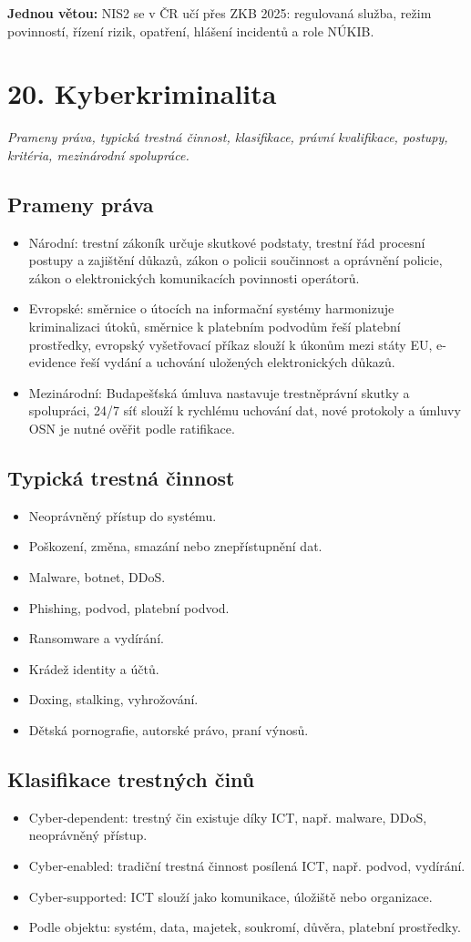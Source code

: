 \documentclass[10pt,a4paper]{article}
\newcommand{\otazka}[2]{\section*{#1}\addcontentsline{toc}{section}{#1}\textit{#2}\par\medskip}
\newcommand{\blok}[1]{\subsection*{#1}}
\newcommand{\mini}[1]{\medskip\noindent\colorbox{blue!7}{\parbox{\dimexpr\linewidth-2\fboxsep}{\textbf{Jednou větou:} #1}}\par\medskip}
\begin{document}
\mini{NIS2 se v ČR učí přes ZKB 2025: regulovaná služba, režim povinností, řízení rizik, opatření, hlášení incidentů a role NÚKIB.}

\newpage

\otazka{20. Kyberkriminalita}{Prameny práva, typická trestná činnost, klasifikace, právní kvalifikace, postupy, kritéria, mezinárodní spolupráce.}

\blok{Prameny práva}
\begin{itemize}
  \item Národní: trestní zákoník určuje skutkové podstaty, trestní řád procesní postupy a zajištění důkazů, zákon o policii součinnost a oprávnění policie, zákon o elektronických komunikacích povinnosti operátorů.
  \item Evropské: směrnice o útocích na informační systémy harmonizuje kriminalizaci útoků, směrnice k platebním podvodům řeší platební prostředky, evropský vyšetřovací příkaz slouží k úkonům mezi státy EU, e-evidence řeší vydání a uchování uložených elektronických důkazů.
  \item Mezinárodní: Budapešťská úmluva nastavuje trestněprávní skutky a spolupráci, 24/7 síť slouží k rychlému uchování dat, nové protokoly a úmluvy OSN je nutné ověřit podle ratifikace.
\end{itemize}

\blok{Typická trestná činnost}
\begin{itemize}
  \item Neoprávněný přístup do systému.
  \item Poškození, změna, smazání nebo znepřístupnění dat.
  \item Malware, botnet, DDoS.
  \item Phishing, podvod, platební podvod.
  \item Ransomware a vydírání.
  \item Krádež identity a účtů.
  \item Doxing, stalking, vyhrožování.
  \item Dětská pornografie, autorské právo, praní výnosů.
\end{itemize}

\blok{Klasifikace trestných činů}
\begin{itemize}
  \item Cyber-dependent: trestný čin existuje díky ICT, např. malware, DDoS, neoprávněný přístup.
  \item Cyber-enabled: tradiční trestná činnost posílená ICT, např. podvod, vydírání.
  \item Cyber-supported: ICT slouží jako komunikace, úložiště nebo organizace.
  \item Podle objektu: systém, data, majetek, soukromí, důvěra, platební prostředky.
\end{itemize}
\end{document}
